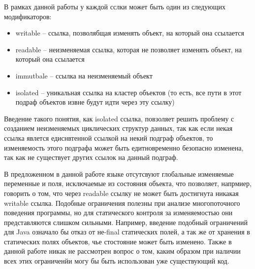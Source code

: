 В рамках данной работы у каждой сслки может быть один из следующих модификаторов:
\begin{itemize}
\item writable -- ссылка, позволябщая изменять объект, на который она ссылается
\item readable -- неизменяемая ссылка, которая не позволяет изменять объект, на который она ссылается
\item immutbale -- ссылка на неизменяемый объект
\item isolated -- уникальная ссылка на кластер объектов (то есть, все пути в этот подраф объектов извне будут идти через эту ссылку)
\end{itemize}

Введение такого понятия, как isolated ссылка, повзоляет решить проблему с созданием неизменяемых циклических структур данных, так как если некая ссылка явлется едиснвтенной ссылкой на некий подграф объектов, то изменяемость этого подграфа может быть едитновременно безопасно изменена, так как не существует других ссылок на данный подграф. 

В предложенном в данной работе языке отсутсвуют глобальные изменяемые переменные и поля, исключаемые из состояния объекта, что позволяет, напрмиер, говорить о том, что через readable ссылку не может быть достигнута никакая writable ссылка. Подобные ограничения полезны при анализе многопоточного поведения программы, но для статического контроля за изменяемостью они представляются слишком сильными. Например, введение подобный ограничений для Java означало бы отказ от не-final статических полей, а так же от хранения в статических полях объектов, чье стостояние может быть изменено. Также в данной работе никак не рассмотрен вопрос о том, каким образом при наличии всех этих ограниченйи могу бы быть использован уже существующий код.




























